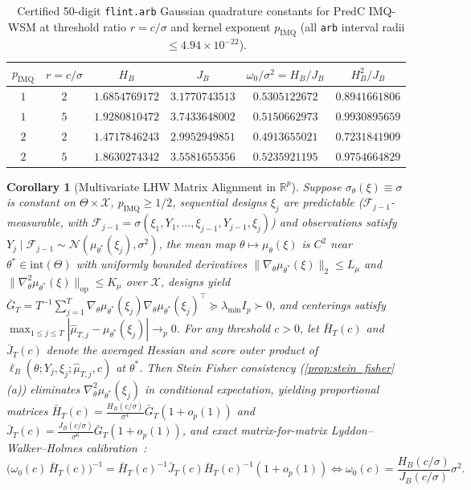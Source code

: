 \documentclass[11pt,a4paper,reqno]{amsart}
\newtheorem{corollary}[theorem]{Corollary}
\theoremstyle{definition}
\theoremstyle{remark}
\newcommand{\R}{\mathbb{R}}
\newcommand{\Ncal}{\mathcal{N}}
\newcommand{\Xcal}{\mathcal{X}}
\begin{document}
\begin{table}[t]
\centering
\small
\caption{Certified 50-digit \texttt{flint.arb} Gaussian quadrature constants for PredC IMQ-WSM at threshold ratio $r = c/\sigma$ and kernel exponent $p_{\mathrm{IMQ}}$ (all \texttt{arb} interval radii $\le 4.94 \times 10^{-22}$).}\label{tab:quadrature}
\begin{tabular}{@{}cccccc@{}}
\toprule
$p_{\mathrm{IMQ}}$ & $r = c/\sigma$ & $H_B$ & $J_B$ & $\omega_0 / \sigma^2 = H_B/J_B$ & $H_B^2/J_B$ \\
\midrule
$1$ & $2$ & $1.6854769172$ & $3.1770743513$ & $0.5305122672$ & $0.8941661806$ \\
$1$ & $5$ & $1.9280810472$ & $3.7433648002$ & $0.5150662973$ & $0.9930895659$ \\
$2$ & $2$ & $1.4717846243$ & $2.9952949851$ & $0.4913655021$ & $0.7231841909$ \\
$2$ & $5$ & $1.8630274342$ & $3.5581655356$ & $0.5235921195$ & $0.9754664829$ \\
\bottomrule
\end{tabular}
\end{table}

\begin{corollary}[Multivariate LHW Matrix Alignment in $\R^p$]\label{cor:multivariate_lhw}
Suppose $\sigma_\theta(\xi) \equiv \sigma$ is constant on $\Theta \times \Xcal$, $p_{\mathrm{IMQ}} \ge 1/2$, sequential designs $\xi_j$ are predictable ($\mathcal{F}_{j-1}$-measurable, with $\mathcal{F}_{j-1} = \sigma(\xi_1, Y_1, \dots, \xi_{j-1}, Y_{j-1}, \xi_j)$) and observations satisfy $Y_j \mid \mathcal{F}_{j-1} \sim \Ncal(\mu_{\theta^*}(\xi_j), \sigma^2)$, the mean map $\theta \mapsto \mu_\theta(\xi)$ is $C^2$ near $\theta^* \in \mathrm{int}(\Theta)$ with uniformly bounded derivatives $\|\nabla_\theta\mu_{\theta^*}(\xi)\|_2 \le L_\mu$ and $\|\nabla_\theta^2\mu_{\theta^*}(\xi)\|_{\mathrm{op}} \le K_\mu$ over $\Xcal$, designs yield $\bar{G}_T = T^{-1}\sum_{j=1}^T \nabla_\theta \mu_{\theta^*}(\xi_j)\nabla_\theta \mu_{\theta^*}(\xi_j)^\top \succeq \lambda_{\min} I_p \succ 0$, and centerings satisfy $\max_{1\le j\le T}|\hat{\mu}_{T,j} - \mu_{\theta^*}(\xi_j)| \to_p 0$. For any threshold $c > 0$, let $\bar{H}_T(c)$ and $\bar{J}_T(c)$ denote the averaged Hessian and score outer product of $\ell_B(\theta; Y_j, \xi_j; \hat{\mu}_{T,j}, c)$ at $\theta^*$. Then Stein Fisher consistency (\cref{prop:stein_fisher}(a)) eliminates $\nabla_\theta^2 \mu_{\theta^*}(\xi_j)$ in conditional expectation, yielding proportional matrices $\bar{H}_T(c) = \frac{H_B(c/\sigma)}{\sigma^4}\bar{G}_T(1+o_p(1))$ and $\bar{J}_T(c) = \frac{J_B(c/\sigma)}{\sigma^6}\bar{G}_T(1+o_p(1))$, and exact matrix-for-matrix Lyddon--Walker--Holmes calibration~\cite{lyddon2019general,godambe1960optimum}:
\[
\bigl(\omega_0(c)\,\bar{H}_T(c)\bigr)^{-1} = \bar{H}_T(c)^{-1} \bar{J}_T(c) \bar{H}_T(c)^{-1}(1 + o_p(1)) \iff \omega_0(c) = \frac{H_B(c/\sigma)}{J_B(c/\sigma)}\sigma^2.
\]
\end{corollary}
\end{document}
